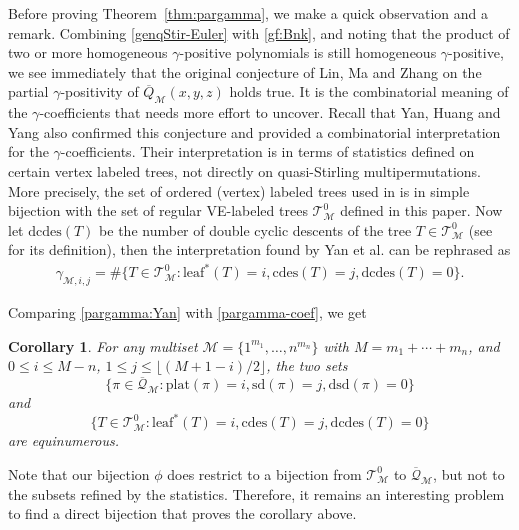 \documentclass[11pt,reqno]{amsart}
\numberwithin{equation}{section}
\theoremstyle{plain}
\newtheorem{corollary}[theorem]{Corollary}
\theoremstyle{definition}
\newcommand{\Q}{\mathcal{Q}}
\newcommand{\bQ}{\overline{\mathcal{Q}}}
\newcommand{\M}{\mathcal{M}}
\newcommand{\T}{\mathcal{T}}
\def\cdes{\mathrm{cdes}}
\def\plat{\mathrm{plat}}
\def\lleaf{\mathrm{leaf}^*}
\def\sdes{\mathrm{sd}}
\def\sddes{\mathrm{dsd}}
\def\dcdes{\mathrm{dcdes}}
\begin{document}
Before proving Theorem~\ref{thm:pargamma}, we make a quick observation and a remark. Combining \eqref{genqStir-Euler} with \eqref{gf:Bnk}, and noting that the product of two or more homogeneous $\gamma$-positive polynomials is still homogeneous $\gamma$-positive, we see immediately that the original conjecture of Lin, Ma and Zhang on the partial $\gamma$-positivity of $\overline{Q}_{\M}(x,y,z)$ holds true. It is the combinatorial meaning of the $\gamma$-coefficients that needs more effort to uncover. Recall that Yan, Huang and Yang \cite{YHY} also confirmed this conjecture and provided a combinatorial interpretation for the $\gamma$-coefficients. Their interpretation is in terms of statistics defined on certain vertex labeled trees, not directly on quasi-Stirling multipermutations. More precisely, the set of ordered (vertex) labeled trees used in \cite{YHY} is in simple bijection with the set of regular VE-labeled trees $\T_{\M}^0$ defined in this paper. Now let $\dcdes(T)$ be the number of double cyclic descents of the tree $T\in\T_{\M}^0$ (see \cite{YHY} for its definition), then the interpretation found by Yan et al. \cite[Thm.~3.2]{YHY} can be rephrased as
\begin{align}\label{pargamma:Yan}
\gamma_{\M,i,j}=\#\{T\in\T_{\M}^0:\lleaf(T)=i,\cdes(T)=j,\dcdes(T)=0\}.
\end{align}

Comparing \eqref{pargamma:Yan} with \eqref{pargamma-coef}, we get
\begin{corollary}
For any multiset $\M=\{1^{m_1},\ldots,n^{m_n}\}$ with $M=m_1+\cdots+m_n$, and $0\le i\le M-n$, $1\le j\le \lfloor(M+1-i)/2\rfloor$, the two sets
$$\{\pi\in\bQ_{\M}:\plat(\pi)=i,\sdes(\pi)=j,\sddes(\pi)=0\}$$
and
$$\{T\in\T_{\M}^0:\lleaf(T)=i,\cdes(T)=j,\dcdes(T)=0\}$$
are equinumerous.
\end{corollary}

Note that our bijection $\phi$ does restrict to a bijection from $\T_{\M}^0$ to $\overline{\Q}_{\M}$, but not to the subsets refined by the statistics. Therefore, it remains an interesting problem to find a direct bijection that proves the corollary above.
\end{document}
